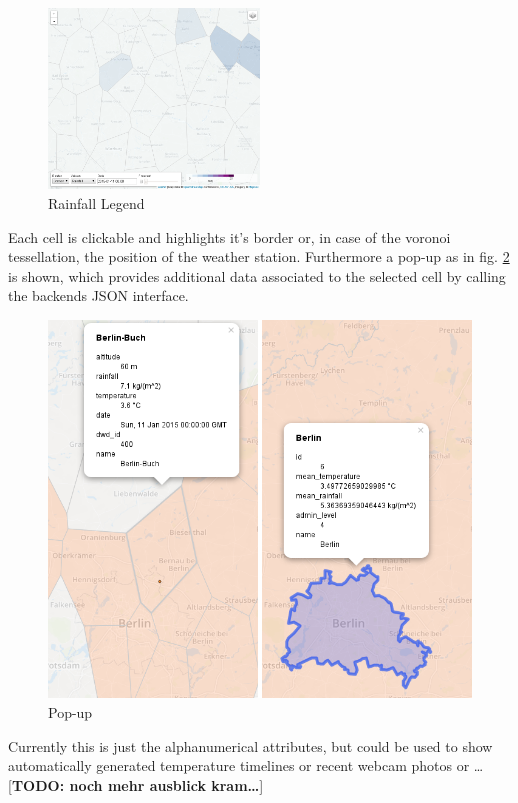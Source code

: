 \documentclass[paper=a4, fontsize=11pt]{scrartcl} %
\numberwithin{equation}{section} %
\numberwithin{figure}{section} %
\numberwithin{table}{section} %
\begin{document}
\begin{figure}[htbp]
\centering
\includegraphics[width=0.5\textwidth]{pictures/screenshot-legend-rain.png}
\caption{Rainfall Legend}
\label{fig:rainfall-legend}
\end{figure}

\newpage
Each cell is clickable and highlights it's border or, in case of the
voronoi tessellation, the position of the weather station. Furthermore a
pop-up as in fig. \ref{fig:popup} is shown, which provides additional data associated to the
selected cell by calling the backends JSON interface.

\begin{figure}[htbp]
\centering
\includegraphics[width=1\textwidth]{pictures/screenshot-popup.png}
\caption{Pop-up}
\label{fig:popup}
\end{figure}

Currently this is just the alphanumerical attributes, but could be used
to show automatically generated temperature timelines or recent webcam
photos or \ldots{} {[}\textbf{TODO: noch mehr ausblick kram\ldots{}}{]}
\end{document}
